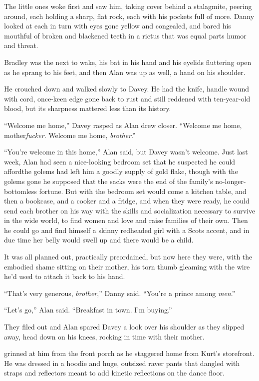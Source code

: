The little ones woke first and saw him, taking cover behind a
stalagmite, peering around, each holding a sharp, flat rock, each with
his pockets full of more.  Danny looked at each in turn with eyes gone
yellow and congealed, and bared his mouthful of broken and blackened
teeth in a rictus that was equal parts humor and threat.

Bradley was the next to wake, his bat in his hand and his eyelids
fluttering open as he sprang to his feet, and then Alan was up as
well, a hand on his shoulder.

He crouched down and walked slowly to Davey.  He had the knife, handle
wound with cord, once-keen edge gone back to rust and still reddened
with ten-year-old blood, but its sharpness mattered less than its
history.

``Welcome me home,'' Davey rasped as Alan drew closer.  ``Welcome me
home, mother\textit{fucker}.  Welcome me home, \textit{brother}.''

``You're welcome in this home,'' Alan said, but Davey wasn't welcome. 
Just last week, Alan had seen a nice-looking bedroom set that he
suspected he could afford\dash{}the golems had left him a goodly supply of
gold flake, though with the golems gone he supposed that the sacks
were the end of the family's no-longer-bottomless fortune.  But with
the bedroom set would come a kitchen table, and then a bookcase, and a
cooker and a fridge, and when they were ready, he could send each
brother on his way with the skills and socialization necessary to
survive in the wide world, to find women and love and raise families
of their own.  Then he could go and find himself a skinny redheaded
girl with a Scots accent, and in due time her belly would swell up and
there would be a child.

It was all planned out, practically preordained, but now here they
were, with the embodied shame sitting on their mother, his torn thumb
gleaming with the wire he'd used to attach it back to his hand.

``That's very generous, \textit{brother},'' Danny said.  ``You're a
prince among \textit{men}.''

``Let's go,'' Alan said.  ``Breakfast in town.  I'm buying.''

They filed out and Alan spared Davey a look over his shoulder as they
slipped away, head down on his knees, rocking in time with their
mother.

 grinned at him from the front porch as he staggered home from
Kurt's storefront.  He was dressed in a hoodie and huge, outsized
raver pants that dangled with straps and reflectors meant to add
kinetic reflections on the dance floor.

